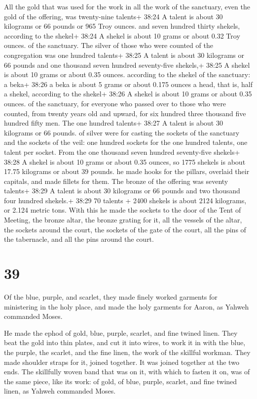  All the gold that was used for the work in all the work of
the sanctuary, even the gold of the offering, was twenty-nine talents+
38:24 A talent is about 30 kilograms or 66 pounds or 965 Troy ounces.
and seven hundred thirty shekels, according to the shekel+ 38:24 A
shekel is about 10 grams or about 0.32 Troy ounces. of the sanctuary.
 The silver of those who were counted of the congregation
was one hundred talents+ 38:25 A talent is about 30 kilograms or 66
pounds and one thousand seven hundred seventy-five shekels,+ 38:25 A
shekel is about 10 grams or about 0.35 ounces. according to the shekel
of the sanctuary:  a beka+ 38:26 a beka is about 5 grams or
about 0.175 ounces a head, that is, half a shekel, according to the
shekel+ 38:26 A shekel is about 10 grams or about 0.35 ounces. of the
sanctuary, for everyone who passed over to those who were counted, from
twenty years old and upward, for six hundred three thousand five hundred
fifty men.  The one hundred talents+ 38:27 A talent is
about 30 kilograms or 66 pounds. of silver were for casting the sockets
of the sanctuary and the sockets of the veil: one hundred sockets for
the one hundred talents, one talent per socket.  From the
one thousand seven hundred seventy-five shekels+ 38:28 A shekel is about
10 grams or about 0.35 ounces, so 1775 shekels is about 17.75 kilograms
or about 39 pounds. he made hooks for the pillars, overlaid their
capitals, and made fillets for them.  The bronze of the
offering was seventy talents+ 38:29 A talent is about 30 kilograms or 66
pounds and two thousand four hundred shekels.+ 38:29 70 talents + 2400
shekels is about 2124 kilograms, or 2.124 metric tons. 
With this he made the sockets to the door of the Tent of Meeting, the
bronze altar, the bronze grating for it, all the vessels of the altar,
 the sockets around the court, the sockets of the gate of
the court, all the pins of the tabernacle, and all the pins around the
court.

\hypertarget{section-38}{%
\section{39}\label{section-38}}

 Of the blue, purple, and scarlet, they made finely worked
garments for ministering in the holy place, and made the holy garments
for Aaron, as Yahweh commanded Moses.

 He made the ephod of gold, blue, purple, scarlet, and fine
twined linen.  They beat the gold into thin plates, and cut
it into wires, to work it in with the blue, the purple, the scarlet, and
the fine linen, the work of the skillful workman.  They made
shoulder straps for it, joined together. It was joined together at the
two ends.  The skillfully woven band that was on it, with
which to fasten it on, was of the same piece, like its work: of gold, of
blue, purple, scarlet, and fine twined linen, as Yahweh commanded Moses.


